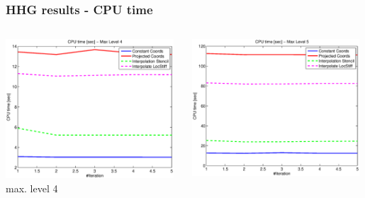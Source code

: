 \documentclass[t,compress=false,usepdftitle=false]{beamer}
\begin{document}
\begin{frame}\frametitle{HHG results - CPU time}

\begin{columns}[T] 
\begin{column}[T]{4.3cm} 
  \centering
  \includegraphics[width=0.98\textwidth]{spherestokes_cpuTime_level4}\\
  max. level 4
\end{column}\hfill
\begin{column}[T]{4.3cm} 
  \centering
  \includegraphics[width=0.98\textwidth]{spherestokes_cpuTime_level5}\\

\end{column}
\end{columns}
\end{frame}
\end{document}
